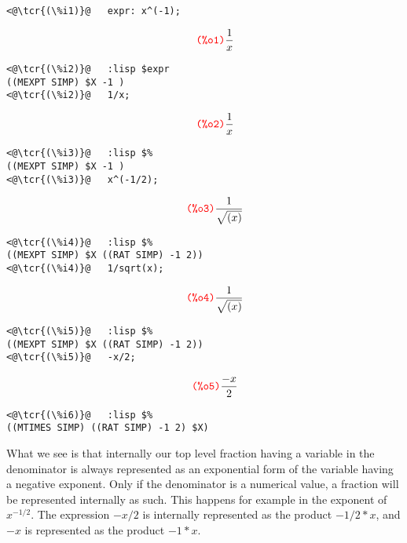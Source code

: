 \documentclass[../Maxima_Workbook.tex]{subfiles}
\begin{document}
\lz \begin{small}
\color{blue} \leqn
\begin{lstlisting}
<@\tcr{(\%i1)}@   expr: x^(-1);
\end{lstlisting}
\vspace{-5mm} \[\tag*{\tcr{\ttfamily (\%o1)}} \frac{1}{x} \]
\vspace{-6mm} \begin{lstlisting}
<@\tcr{(\%i2)}@   :lisp $expr
((MEXPT SIMP) $X -1 )
<@\tcr{(\%i2)}@   1/x;
\end{lstlisting}
\vspace{-5mm} \[\tag*{\tcr{\ttfamily (\%o2)}} \frac{1}{x} \]
\vspace{-6mm} \begin{lstlisting}
<@\tcr{(\%i3)}@   :lisp $%
((MEXPT SIMP) $X -1 )
<@\tcr{(\%i3)}@   x^(-1/2);
\end{lstlisting}
\vspace{-5mm} \[\tag*{\tcr{\ttfamily (\%o3)}} \frac{1}{\sqrt{(x)}} \]
\vspace{-6mm} \begin{lstlisting}
<@\tcr{(\%i4)}@   :lisp $%
((MEXPT SIMP) $X ((RAT SIMP) -1 2))
<@\tcr{(\%i4)}@   1/sqrt(x);
\end{lstlisting}
\vspace{-5mm} \[\tag*{\tcr{\ttfamily (\%o4)}} \frac{1}{\sqrt{(x)}} \]
\vspace{-6mm} \begin{lstlisting}
<@\tcr{(\%i5)}@   :lisp $%
((MEXPT SIMP) $X ((RAT SIMP) -1 2))
<@\tcr{(\%i5)}@   -x/2;
\end{lstlisting}
\vspace{-5mm} \[\tag*{\tcr{\ttfamily (\%o5)}} \frac{-x}{2} \]
\vspace{-6mm} \begin{lstlisting}
<@\tcr{(\%i6)}@   :lisp $%
((MTIMES SIMP) ((RAT SIMP) -1 2) $X)
\end{lstlisting}
\color{black} \reqn
\end{small}

\lz What we see is that internally our top level fraction having a variable in the denominator is always represented as an exponential form of the variable having a negative exponent. Only if the denominator is a numerical value, a fraction will be represented internally as such. This happens for example in the exponent of $ x^{-1/2} $. The expression $ -x/2 $ is internally represented as the product $ -1/2 * x $, and $ -x $ is represented as the product $ -1 * x $. 
\end{document}
